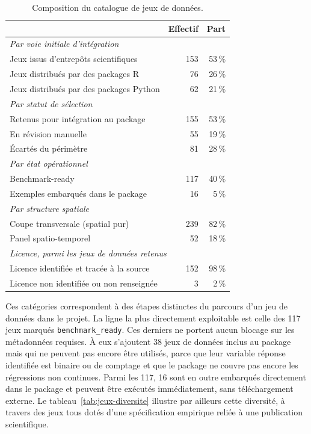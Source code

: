 \documentclass[11pt,a4paper]{article}
\begin{document}
\begin{table}[H]
\centering
\small
\begin{tabular}{lrr}
\toprule
& Effectif & Part \\
\midrule
\multicolumn{3}{l}{\textit{Par voie initiale d'intégration}} \\
Jeux issus d'entrepôts scientifiques & 153 & 53\,\% \\
Jeux distribués par des packages R & 76 & 26\,\% \\
Jeux distribués par des packages Python & 62 & 21\,\% \\
\midrule
\multicolumn{3}{l}{\textit{Par statut de sélection}} \\
Retenus pour intégration au package & 155 & 53\,\% \\
En révision manuelle & 55 & 19\,\% \\
Écartés du périmètre & 81 & 28\,\% \\
\midrule
\multicolumn{3}{l}{\textit{Par état opérationnel}} \\
Benchmark-ready & 117 & 40\,\% \\
Exemples embarqués dans le package & 16 & 5\,\% \\
\midrule
\multicolumn{3}{l}{\textit{Par structure spatiale}} \\
Coupe transversale (spatial pur) & 239 & 82\,\% \\
Panel spatio-temporel & 52 & 18\,\% \\
\midrule
\multicolumn{3}{l}{\textit{Licence, parmi les jeux de données retenus}} \\
Licence identifiée et tracée à la source & 152 & 98\,\% \\
Licence non identifiée ou non renseignée & 3 & 2\,\% \\
\bottomrule
\end{tabular}
\caption{Composition du catalogue de jeux de données.}
\label{tab:composition-catalogue}
\end{table}

Ces catégories correspondent à des étapes distinctes du parcours d'un jeu de données dans le projet. La ligne la plus directement exploitable est celle des 117 jeux marqués \texttt{benchmark\_ready}. Ces derniers ne portent aucun blocage sur les métadonnées requises. À eux s'ajoutent 38 jeux de données inclus au package mais qui ne peuvent pas encore être utilisés, parce que leur variable réponse identifiée est binaire ou de comptage et que le package ne couvre pas encore les régressions non continues. Parmi les 117, 16 sont en outre embarqués directement dans le package et peuvent être exécutés immédiatement, sans téléchargement externe. Le tableau~\ref{tab:jeux-diversite} illustre par ailleurs cette diversité, à travers des jeux tous dotés d'une spécification empirique reliée à une publication scientifique.
\end{document}
